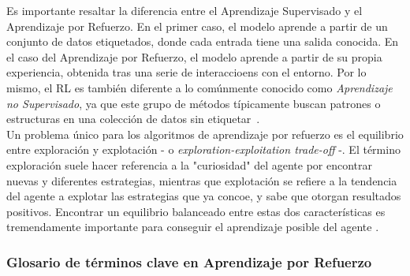 Es importante resaltar la diferencia entre el Aprendizaje Supervisado y el Aprendizaje por Refuerzo. 
En el primer caso, el modelo aprende a partir de un conjunto de datos etiquetados, donde cada 
entrada tiene una salida conocida. En el caso del Aprendizaje por Refuerzo, el modelo aprende a 
partir de su propia experiencia, obtenida tras una serie de interaccioens con el entorno. Por lo 
mismo, el RL es también diferente a lo comúnmente conocido como \textit{Aprendizaje no Supervisado}, 
ya que este grupo de métodos típicamente buscan patrones o estructuras en una colección de datos sin
etiquetar~\cite{sutton2018reinforcement}.\\

Un problema único para los algoritmos de aprendizaje por refuerzo es el equilibrio entre 
exploración y explotación - o \textit{exploration-exploitation trade-off} -. El término exploración
suele hacer referencia a la "curiosidad" del agente por encontrar nuevas y diferentes estrategias,
mientras que explotación se refiere a la tendencia del agente a explotar las estrategias que ya
concoe, y sabe que otorgan resultados positivos. Encontrar un equilibrio balanceado entre estas 
dos características es tremendamente importante para conseguir el aprendizaje posible del agente
\cite{sutton2018reinforcement}.

\subsubsection{Glosario de términos clave en Aprendizaje por Refuerzo}

